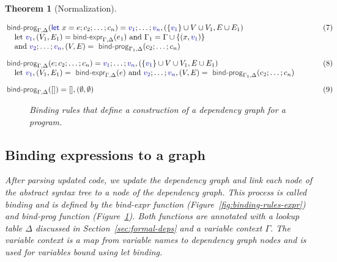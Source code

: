 \documentclass[acmsmall,anonymous,fleqn]{acmart}\settopmatter{printfolios=false,printccs=false,printacmref=false}
\newcounter{thc}
\theoremstyle{plain}
\newtheorem{theorem}[thc]{Theorem}
\theoremstyle{definition}
\newcommand{\ident}[1]{\textnormal{\textcolor{idclr}{\sffamily #1}}}
\newcommand{\kvd}[1]{\textnormal{\textcolor{kvdclr}{\sffamily #1}}}
\newcommand{\bndclr}[1]{\textcolor{kvdclr}{#1}}
\begin{document}
\begin{theorem}[Normalization]

\begin{figure}[t]
\begin{equation*}
\hspace{-3.5em}
\begin{array}{ll}
\ident{bind-prog}_{\Gamma, \Delta}(\kvd{let}~x=e; c_2; \ldots; c_n) = \bndclr{v_1};\ldots;\bndclr{v_n}, (\{\bndclr{v_1}\} \cup V \cup V_1, E \cup E_1)
  \hspace{9.35em}&(7)\\
\quad \textnormal{let}~\bndclr{v_1}, (V_1,E_1) = \ident{bind-expr}_{\Gamma,\Delta}(e_1)~\textnormal{and}~\Gamma_1 = \Gamma \cup \{(x,\bndclr{v_1})\} \\
\quad \textnormal{and}~\bndclr{v_2}; \ldots; \bndclr{v_n}, (V, E) = \ident{bind-prog}_{\Gamma_1, \Delta}(c_2; \ldots; c_n)
\\[1em]
\ident{bind-prog}_{\Gamma, \Delta}(e; c_2; \ldots; c_n) = \bndclr{v_1};\ldots;\bndclr{v_n}, (\{\bndclr{v_1}\} \cup V \cup V_1, E \cup E_1)&(8)\\
\quad \textnormal{let}~\bndclr{v_1}, (V_1,E_1) = \ident{bind-expr}_{\Gamma,\Delta}(e)
~\textnormal{and}~\bndclr{v_2}; \ldots; \bndclr{v_n}, (V, E) = \ident{bind-prog}_{\Gamma_1, \Delta}(c_2; \ldots; c_n)
\\[1em]
\ident{bind-prog}_{\Gamma, \Delta}([]) = [], (\emptyset, \emptyset)&(9)
\end{array}
\end{equation*}
\caption{Binding rules that define a construction of a dependency graph for a program.}
\label{fig:binding-rules-prog}
\end{figure}



\subsection{Binding expressions to a graph}
\label{sec:formal-bind}

After parsing updated code, we update the dependency graph and link each node of the abstract
syntax tree to a node of the dependency graph. This process is called
binding and is defined by the \ident{bind-expr} function (Figure~\ref{fig:binding-rules-expr})
and \ident{bind-prog} function (Figure~\ref{fig:binding-rules-prog}). Both functions are
annotated with a lookup table $\Delta$ discussed in Section~\ref{sec:formal-deps} and a variable
context $\Gamma$. The variable context is a map from variable names to dependency graph nodes and
is used for variables bound using \kvd{let} binding.


\end{theorem}
\end{document}
